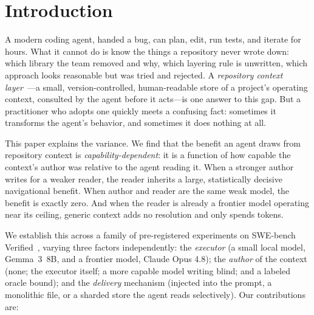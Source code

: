 \documentclass[sigconf,nonacm]{acmart}
\begin{document}

\maketitle

\section{Introduction}
A modern coding agent, handed a bug, can plan, edit, run tests, and iterate for
hours. What it cannot do is know the things a repository never wrote down: which
library the team removed and why, which layering rule is unwritten, which
approach looks reasonable but was tried and rejected. A \emph{repository context
layer}~\cite{manifesto,rcl}---a small, version-controlled, human-readable store
of a project's operating context, consulted by the agent before it acts---is one
answer to this gap. But a practitioner who adopts one quickly meets a confusing
fact: sometimes it transforms the agent's behavior, and sometimes it does
nothing at all.

This paper explains the variance. We find that the benefit an agent draws from
repository context is \emph{capability-dependent}: it is a function of how
capable the context's author was relative to the agent reading it. When a
stronger author writes for a weaker reader, the reader inherits a large,
statistically decisive navigational benefit. When author and reader are the same
weak model, the benefit is exactly zero. And when the reader is already a
frontier model operating near its ceiling, generic context adds no resolution
and only spends tokens.

We establish this across a family of pre-registered experiments on SWE-bench
Verified~\cite{swebench}, varying three factors independently: the \emph{executor}
(a small local model, Gemma~3~8B, and a frontier model, Claude Opus 4.8); the
\emph{author} of the context (none; the executor itself; a more capable model
writing blind; and a labeled oracle bound); and the \emph{delivery} mechanism
(injected into the prompt, a monolithic file, or a sharded store the agent reads
selectively). Our contributions are:
\end{document}

